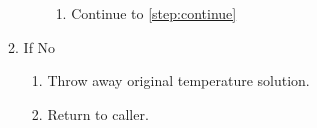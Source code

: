 \documentclass[letterpaper]{report}
\begin{document}
\begin{enumerate}
\begin{enumerate}
\begin{enumerate}
\begin{enumerate}
                  \item Continue to \ref{step:continue}
              \end{enumerate}
        \end{enumerate}
        \item If No
        \begin{enumerate}
            \item \label{step:continue} Throw away original temperature solution.
            \item Return to caller.
        \end{enumerate}
      \end{enumerate}
\end{enumerate}
\end{document}
